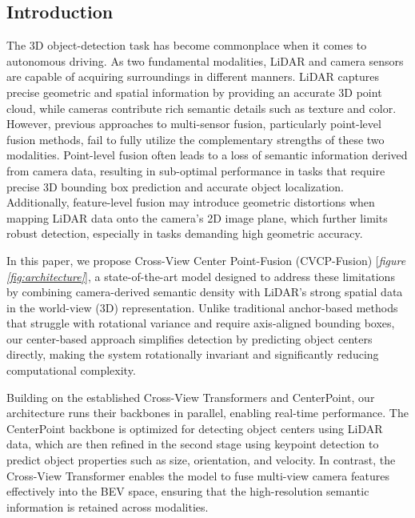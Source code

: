 \documentclass[a4paper,12pt]{article}
\begin{document}
\begin{multicols}{2}

\sectionfont{\fontsize{15}{15}\selectfont}
\section{Introduction}
The 3D object-detection task has become commonplace when it comes to autonomous driving. As two fundamental modalities, LiDAR and camera sensors are capable of acquiring surroundings in different manners. LiDAR captures precise geometric and spatial information by providing an accurate 3D point cloud, while cameras contribute rich semantic details such as texture and color. However, previous approaches to multi-sensor fusion, particularly point-level fusion methods, fail to fully utilize the complementary strengths of these two modalities. Point-level fusion often leads to a loss of semantic information derived from camera data, resulting in sub-optimal performance in tasks that require precise 3D bounding box prediction and accurate object localization. Additionally, feature-level fusion may introduce geometric distortions when mapping LiDAR data onto the camera's 2D image plane, which further limits robust detection, especially in tasks demanding high geometric accuracy.

In this paper, we propose Cross-View Center Point-Fusion (CVCP-Fusion) [\textit{figure \ref{fig:architecture}}], a state-of-the-art model designed to address these limitations by combining camera-derived semantic density with LiDAR's strong spatial data in the world-view (3D) representation. Unlike traditional anchor-based methods that struggle with rotational variance and require axis-aligned bounding boxes, our center-based approach simplifies detection by predicting object centers directly, making the system rotationally invariant and significantly reducing computational complexity.

Building on the established Cross-View Transformers\cite{CVT} and CenterPoint\cite{Center-Point}, our architecture runs their backbones in parallel, enabling real-time performance. The CenterPoint backbone is optimized for detecting object centers using LiDAR data, which are then refined in the second stage using keypoint detection to predict object properties such as size, orientation, and velocity. In contrast, the Cross-View Transformer enables the model to fuse multi-view camera features effectively into the BEV space, ensuring that the high-resolution semantic information is retained across modalities.


\end{multicols}
\end{document}
